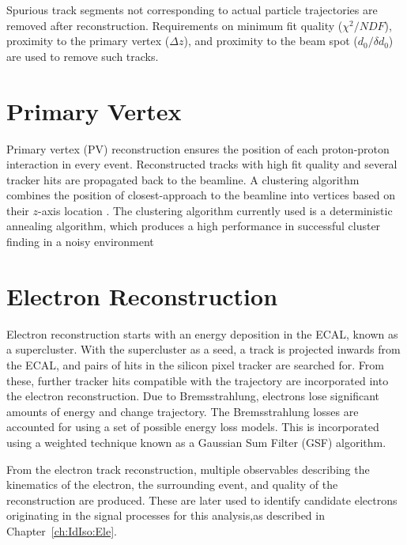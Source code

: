 Spurious track segments not corresponding to actual particle trajectories are removed after reconstruction. Requirements on minimum fit quality ($\chi^2/NDF$), proximity to the primary vertex ($\Delta z$), and proximity to the beam spot ($d_0/\delta d_0$) are used to remove such tracks. 

\section{Primary Vertex}
Primary vertex (PV) reconstruction ensures the position of each proton-proton interaction in every event. Reconstructed tracks with high fit quality and several tracker hits are propagated back to the beamline. A clustering algorithm combines the position of closest-approach to the beamline into vertices based on their $z$-axis location \cite{Chatrchyan:2014fea}. The clustering algorithm currently used is a deterministic annealing algorithm, which produces a high performance in successful cluster finding in a noisy environment \cite{Chabanat:2005zz}


\section{Electron Reconstruction}\label{ch:reco:ele}
Electron reconstruction starts with an energy deposition in the ECAL, known as a supercluster. With the supercluster as a seed, a track is projected inwards from the ECAL, and pairs of hits in the silicon pixel tracker are searched for. From these, further tracker hits compatible with the trajectory are incorporated into the electron reconstruction. Due to Bremsstrahlung, electrons lose significant amounts of energy and change trajectory. The Bremsstrahlung losses are accounted for using a set of possible energy loss models. This is incorporated using a weighted technique known as a Gaussian Sum Filter (GSF) algorithm. 

From the electron track reconstruction, multiple observables describing the kinematics of the electron, the surrounding event, and quality of the reconstruction are produced. These are later used to identify candidate electrons originating in the signal processes for this analysis,as described in Chapter~\ref{ch:IdIso:Ele}.  

